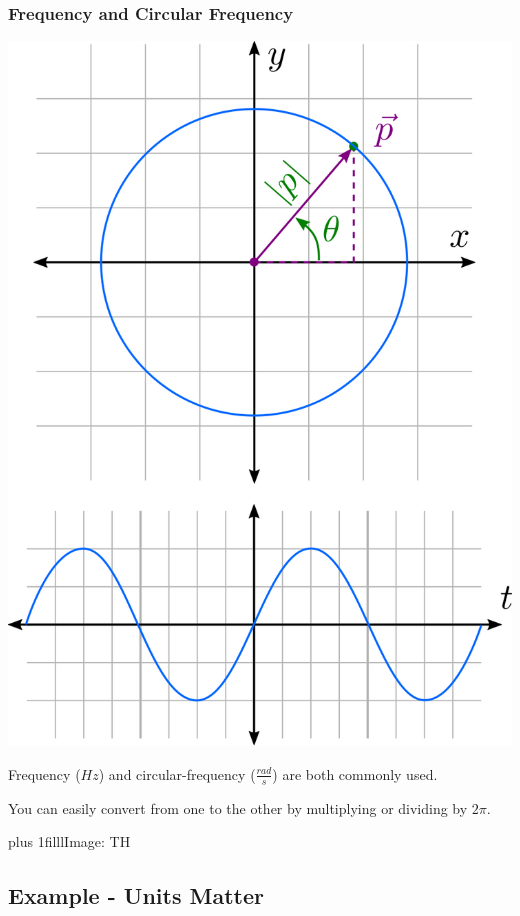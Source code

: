 \documentclass[fleqn]{beamer} %
\newcommand{\sectionIIsubsectionIIItitle}{Frequency and Circular Frequency}
\newcommand{\sectionIIsubsectionIVtitle}{Example - Units Matter}
\newcommand{\btVFill}{\vskip0pt plus 1filll}
\begin{document}
			\begin{frame}
				\frametitle{\sectionIIsubsectionIIItitle}
				\bigskip

				\begin{multicols}{2}

				\includegraphics[scale=.16]{images/circular_frequency_fig2.png}

				Frequency ($Hz$) and circular-frequency ($\frac{rad}{s}$) are both commonly used. \vspace{15mm}

				You can easily convert from one to the other by multiplying or dividing by $2\pi$.
				\end{multicols}

				\btVFill {\tiny Image: TH}
			\end{frame}

		\subsection{\sectionIIsubsectionIVtitle}\label{sectionIIsubsectionIV}
\end{document}
